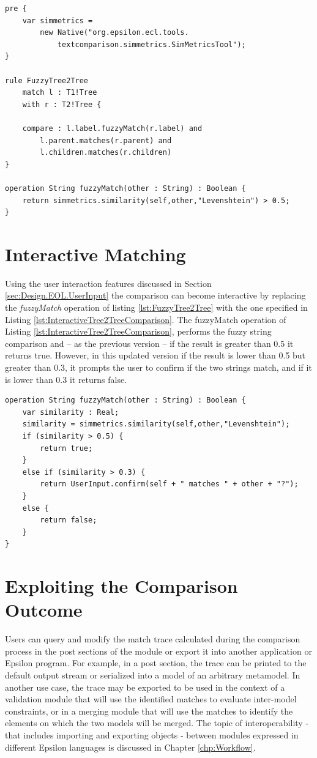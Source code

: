 \begin{lstlisting}[caption=The FuzzyTree2Tree rule, label=lst:FuzzyTree2Tree, language=ECL]
pre {
	var simmetrics = 
		new Native("org.epsilon.ecl.tools.
			textcomparison.simmetrics.SimMetricsTool"); 
}

rule FuzzyTree2Tree 
	match l : T1!Tree
	with r : T2!Tree {
	
	compare : l.label.fuzzyMatch(r.label) and 
		l.parent.matches(r.parent) and
		l.children.matches(r.children)
}

operation String fuzzyMatch(other : String) : Boolean {
	return simmetrics.similarity(self,other,"Levenshtein") > 0.5;
}\end{lstlisting}

\section{Interactive Matching}
\label{sec:InteractiveModelComparison}

Using the user interaction features discussed in Section \ref{sec:Design.EOL.UserInput} the comparison can become interactive by replacing the \emph{fuzzyMatch} operation of listing \ref{lst:FuzzyTree2Tree} with the one specified in Listing \ref{lst:InteractiveTree2TreeComparison}. The fuzzyMatch operation of Listing \ref{lst:InteractiveTree2TreeComparison}, performs the fuzzy string comparison and -- as the previous version -- if the result is greater than 0.5 it returns true. However, in this updated version if the result is lower than 0.5 but greater than 0.3, it prompts the user to confirm if the two strings match, and if it is lower than 0.3 it returns false.

\begin{lstlisting}[caption=An interactive version of the fuzzyMatch operation of Listing \ref{lst:FuzzyTree2Tree}, label=lst:InteractiveTree2TreeComparison, language=ECL]
operation String fuzzyMatch(other : String) : Boolean {
	var similarity : Real;
	similarity = simmetrics.similarity(self,other,"Levenshtein");
	if (similarity > 0.5) {
		return true;
	}
	else if (similarity > 0.3) {
		return UserInput.confirm(self + " matches " + other + "?");
	}
	else {
		return false;
	}
}\end{lstlisting}

\section{Exploiting the Comparison Outcome}

Users can query and modify the match trace calculated during the comparison process in the post sections of the module or export it into another application or Epsilon program. For example, in a post section, the trace can be printed to the default output stream or serialized into a model of an arbitrary metamodel. In another use case, the trace may be exported to be used in the context of a validation module that will use the identified matches to evaluate inter-model constraints, or in a merging module that will use the matches to identify the elements on which the two models will be merged. The topic of interoperability - that includes importing and exporting objects - between modules expressed in different Epsilon languages is discussed in Chapter \ref{chp:Workflow}.